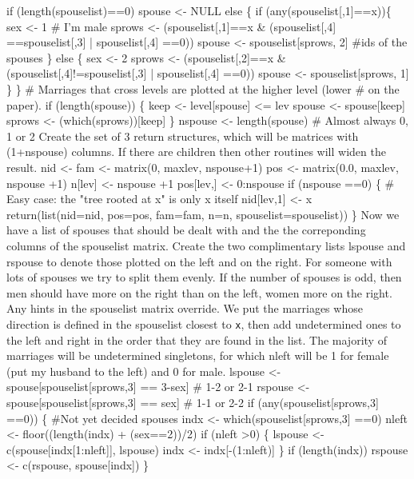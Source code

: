 \documentclass{article}
\begin{document}
    if (length(spouselist)==0)  spouse <- NULL
    else \{
        if (any(spouselist[,1]==x))\{
            sex <- 1                              # I'm male
            sprows <- (spouselist[,1]==x & (spouselist[,4] ==spouselist[,3] |
                                            spouselist[,4] ==0))
            spouse <- spouselist[sprows, 2] #ids of the spouses
            \}
        else \{
            sex <- 2
            sprows <- (spouselist[,2]==x & (spouselist[,4]!=spouselist[,3] |
                                            spouselist[,4] ==0))
            spouse <- spouselist[sprows, 1]
            \}
        \}
    # Marriages that cross levels are plotted at the higher level (lower
    #  on the paper).
    if (length(spouse)) \{
        keep <- level[spouse] <= lev
        spouse <- spouse[keep]
        sprows <- (which(sprows))[keep]
        \}
    nspouse <- length(spouse)  # Almost always 0, 1 or 2
\nwendcode{}\nwdocspar
Create the set of 3 return structures, which will be matrices with
(1+nspouse) columns.
If there are children then other routines will widen the result.
\nwenddocs{}\plusendmoddef
    nid <- fam <- matrix(0, maxlev, nspouse+1)
    pos <- matrix(0.0, maxlev, nspouse +1)
    n[lev] <- nspouse +1       
    pos[lev,] <- 0:nspouse
    if (nspouse ==0) \{   
        # Easy case: the "tree rooted at x" is only x itself
        nid[lev,1] <- x
        return(list(nid=nid, pos=pos, fam=fam, n=n, spouselist=spouselist))
        \}
\nwendcode{}\nwdocspar
Now we have a list of spouses that should be dealt with and 
the the correponding columns of the spouselist matrix.  
Create the two complimentary lists lspouse and rspouse to denote
those plotted on the left and on the right.  
For someone with lots of spouses we try to split them evenly.
If the number of spouses is odd, then men should have more on the
right than on the left, women more on the right.
Any hints in the spouselist matrix override.
We put the marriages whose direction is defined in the spouselist
closest to {\tt{}x}, then add undetermined ones to the left and
right in the order that they are found in the list.
The majority of marriages will be undetermined singletons, for which
nleft will be 1 for female (put my husband to the left) and 0 for male.
\nwenddocs{}\plusendmoddef
    lspouse <- spouse[spouselist[sprows,3] == 3-sex] # 1-2 or 2-1
    rspouse <- spouse[spouselist[sprows,3] == sex]   # 1-1 or 2-2
    if (any(spouselist[sprows,3] ==0)) \{
        #Not yet decided spouses
        indx <- which(spouselist[sprows,3] ==0)
        nleft <- floor((length(indx) + (sex==2))/2)
        if (nleft >0) \{
            lspouse <- c(spouse[indx[1:nleft]], lspouse)
            indx <- indx[-(1:nleft)]
          \}
        if (length(indx)) rspouse <- c(rspouse, spouse[indx])
      \}
\end{document}
